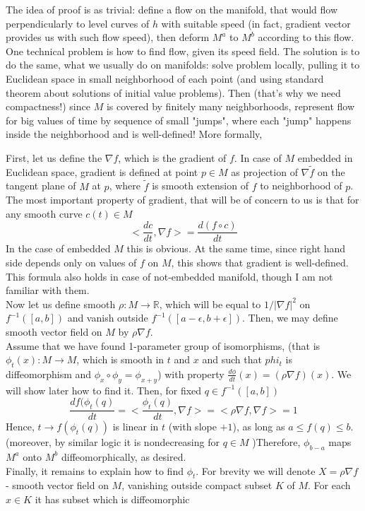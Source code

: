 \documentclass[8pt]{article} %
\newenvironment{proof}[1][Proof]{\begin{trivlist}
\item[\hskip \labelsep {\bfseries #1}]}{\qed\end{trivlist}}
\newcommand{\qed}{\nobreak \ifvmode \relax \else
\ifdim\lastskip<1.5em \hskip-\lastskip
\hskip1.5em plus0em minus0.5em \fi \nobreak
  \vrule height0.75em width0.5em depth0.25em\fi}
\begin{document}
The idea of proof is as trivial: define a flow on the manifold, that would flow perpendicularly to level curves of $h$ with suitable speed
(in fact, gradient vector provides us with such flow speed), then deform $M^a$ to $M^b$ according to this flow. One technical problem is
how to find flow, given its speed field. The solution is to do the same, what we usually do on manifolds: solve problem locally, pulling it to 
Euclidean space in small neighborhood of each point (and using standard theorem about solutions of initial value problems). Then (that's why
we need compactness!) since $M$ is covered by finitely many neighborhoods, represent flow for big values of time by sequence of small "jumps",
where each "jump" happens inside the neighborhood and is well-defined! More formally,
\begin{proof}
	First, let us define the $\nabla f$, which is the gradient of $f$. In case of $M$ embedded in Euclidean space, gradient is defined at point $p\in M$ as projection of $\nabla \tilde{f}$ on the tangent plane of $M$ at $p$, where
	$\tilde{f}$ is smooth extension of $f$ to neighborhood of $p$. The most important property of gradient, that will be of concern to us is that for any smooth curve $c(t)\in M$
	\[<\frac{dc}{dt},\nabla f>=\frac{d (f\circ c)}{dt}\]
	In the case of embedded $M$ this is obvious. At the same time, since right hand side depends only on values of $f$ on $M$, this shows that gradient is well-defined. This formula also holds in case of not-embedded manifold, 
	though I am not familiar with them.\\
	Now let us define smooth $\rho: M\rightarrow \mathbb{R}$, which will be equal to $1/|\nabla f|^2$ on $f^{-1}([a,b])$ and vanish outside $f^{-1}([a-\epsilon,b+\epsilon])$. Then, we may define smooth vector field on $M$ by
	$\rho\nabla f$.\\
	Assume that we have found 1-parameter group of isomorphisms, (that is $\phi_t(x):M\rightarrow M$, which is smooth in $t$ and $x$ and such that $phi_t$ is diffeomorphism and $\phi_x\circ\phi_y=\phi_{x+y}$) with property
	$\frac{d\phi}{dt}(x)=(\rho\nabla f)(x)$. We will show later how to find it. Then, for fixed $q\in f^{-1}([a,b])$
	\[\frac{df(\phi_t(q)}{dt}=<\frac{\phi_t(q)}{dt},\nabla f>=<\rho \nabla f,\nabla f>=1\]
	Hence, $t\rightarrow f(\phi_t(q))$ is linear in $t$ (with slope $+1$), as long as $a\leq f(q)\leq b$. (moreover, by similar logic it is nondecreasing for $q\in M$
	)Therefore, $\phi_{b-a}$ maps $M^a$ onto $M^b$ diffeomorphically, as desired.\\
	Finally, it remains to explain how to find $\phi_t$. For brevity we will denote $X=\rho \nabla f$ - smooth vector field on $M$, vanishing outside compact subset $K$ of $M$. For each $x\in K$ it has subset which is diffeomorphic

\end{proof}
\end{document}
